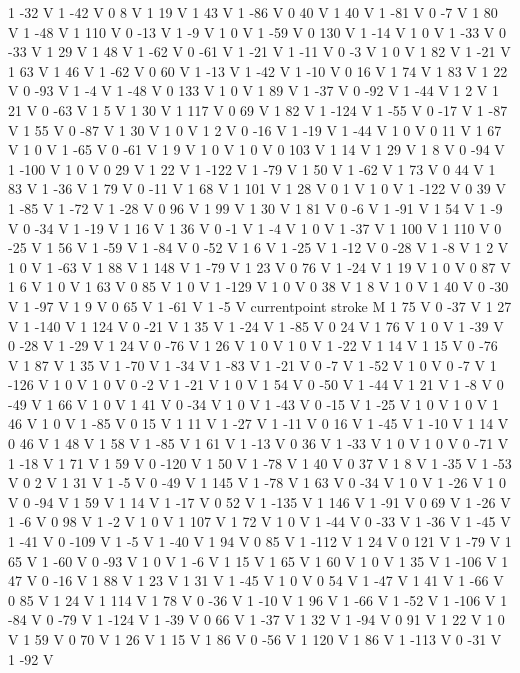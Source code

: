 {{1 -32 V
1 -42 V
0 8 V
1 19 V
1 43 V
1 -86 V
0 40 V
1 40 V
1 -81 V
0 -7 V
1 80 V
1 -48 V
1 110 V
0 -13 V
1 -9 V
1 0 V
1 -59 V
0 130 V
1 -14 V
1 0 V
1 -33 V
0 -33 V
1 29 V
1 48 V
1 -62 V
0 -61 V
1 -21 V
1 -11 V
0 -3 V
1 0 V
1 82 V
1 -21 V
1 63 V
1 46 V
1 -62 V
0 60 V
1 -13 V
1 -42 V
1 -10 V
0 16 V
1 74 V
1 83 V
1 22 V
0 -93 V
1 -4 V
1 -48 V
0 133 V
1 0 V
1 89 V
1 -37 V
0 -92 V
1 -44 V
1 2 V
1 21 V
0 -63 V
1 5 V
1 30 V
1 117 V
0 69 V
1 82 V
1 -124 V
1 -55 V
0 -17 V
1 -87 V
1 55 V
0 -87 V
1 30 V
1 0 V
1 2 V
0 -16 V
1 -19 V
1 -44 V
1 0 V
0 11 V
1 67 V
1 0 V
1 -65 V
0 -61 V
1 9 V
1 0 V
1 0 V
0 103 V
1 14 V
1 29 V
1 8 V
0 -94 V
1 -100 V
1 0 V
0 29 V
1 22 V
1 -122 V
1 -79 V
1 50 V
1 -62 V
1 73 V
0 44 V
1 83 V
1 -36 V
1 79 V
0 -11 V
1 68 V
1 101 V
1 28 V
0 1 V
1 0 V
1 -122 V
0 39 V
1 -85 V
1 -72 V
1 -28 V
0 96 V
1 99 V
1 30 V
1 81 V
0 -6 V
1 -91 V
1 54 V
1 -9 V
0 -34 V
1 -19 V
1 16 V
1 36 V
0 -1 V
1 -4 V
1 0 V
1 -37 V
1 100 V
1 110 V
0 -25 V
1 56 V
1 -59 V
1 -84 V
0 -52 V
1 6 V
1 -25 V
1 -12 V
0 -28 V
1 -8 V
1 2 V
1 0 V
1 -63 V
1 88 V
1 148 V
1 -79 V
1 23 V
0 76 V
1 -24 V
1 19 V
1 0 V
0 87 V
1 6 V
1 0 V
1 63 V
0 85 V
1 0 V
1 -129 V
1 0 V
0 38 V
1 8 V
1 0 V
1 40 V
0 -30 V
1 -97 V
1 9 V
0 65 V
1 -61 V
1 -5 V
currentpoint stroke M
1 75 V
0 -37 V
1 27 V
1 -140 V
1 124 V
0 -21 V
1 35 V
1 -24 V
1 -85 V
0 24 V
1 76 V
1 0 V
1 -39 V
0 -28 V
1 -29 V
1 24 V
0 -76 V
1 26 V
1 0 V
1 0 V
1 -22 V
1 14 V
1 15 V
0 -76 V
1 87 V
1 35 V
1 -70 V
1 -34 V
1 -83 V
1 -21 V
0 -7 V
1 -52 V
1 0 V
0 -7 V
1 -126 V
1 0 V
1 0 V
0 -2 V
1 -21 V
1 0 V
1 54 V
0 -50 V
1 -44 V
1 21 V
1 -8 V
0 -49 V
1 66 V
1 0 V
1 41 V
0 -34 V
1 0 V
1 -43 V
0 -15 V
1 -25 V
1 0 V
1 0 V
1 46 V
1 0 V
1 -85 V
0 15 V
1 11 V
1 -27 V
1 -11 V
0 16 V
1 -45 V
1 -10 V
1 14 V
0 46 V
1 48 V
1 58 V
1 -85 V
1 61 V
1 -13 V
0 36 V
1 -33 V
1 0 V
1 0 V
0 -71 V
1 -18 V
1 71 V
1 59 V
0 -120 V
1 50 V
1 -78 V
1 40 V
0 37 V
1 8 V
1 -35 V
1 -53 V
0 2 V
1 31 V
1 -5 V
0 -49 V
1 145 V
1 -78 V
1 63 V
0 -34 V
1 0 V
1 -26 V
1 0 V
0 -94 V
1 59 V
1 14 V
1 -17 V
0 52 V
1 -135 V
1 146 V
1 -91 V
0 69 V
1 -26 V
1 -6 V
0 98 V
1 -2 V
1 0 V
1 107 V
1 72 V
1 0 V
1 -44 V
0 -33 V
1 -36 V
1 -45 V
1 -41 V
0 -109 V
1 -5 V
1 -40 V
1 94 V
0 85 V
1 -112 V
1 24 V
0 121 V
1 -79 V
1 65 V
1 -60 V
0 -93 V
1 0 V
1 -6 V
1 15 V
1 65 V
1 60 V
1 0 V
1 35 V
1 -106 V
1 47 V
0 -16 V
1 88 V
1 23 V
1 31 V
1 -45 V
1 0 V
0 54 V
1 -47 V
1 41 V
1 -66 V
0 85 V
1 24 V
1 114 V
1 78 V
0 -36 V
1 -10 V
1 96 V
1 -66 V
1 -52 V
1 -106 V
1 -84 V
0 -79 V
1 -124 V
1 -39 V
0 66 V
1 -37 V
1 32 V
1 -94 V
0 91 V
1 22 V
1 0 V
1 59 V
0 70 V
1 26 V
1 15 V
1 86 V
0 -56 V
1 120 V
1 86 V
1 -113 V
0 -31 V
1 -92 V
}}
